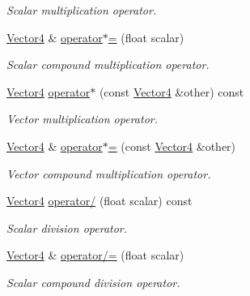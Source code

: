 \begin{DoxyCompactItemize}
\begin{DoxyCompactList}\small\item\em Scalar multiplication operator. \end{DoxyCompactList}\item 
\hyperlink{classchaos_1_1gfx_1_1_vector4}{Vector4} \& \hyperlink{classchaos_1_1gfx_1_1_vector4_ae171d478578a7a1564ca3e869da3b3f8}{operator$\ast$=} (float scalar)
\begin{DoxyCompactList}\small\item\em Scalar compound multiplication operator. \end{DoxyCompactList}\item 
\hyperlink{classchaos_1_1gfx_1_1_vector4}{Vector4} \hyperlink{classchaos_1_1gfx_1_1_vector4_a4f669aee39927f0953a445342754bf81}{operator$\ast$} (const \hyperlink{classchaos_1_1gfx_1_1_vector4}{Vector4} \&other) const 
\begin{DoxyCompactList}\small\item\em Vector multiplication operator. \end{DoxyCompactList}\item 
\hyperlink{classchaos_1_1gfx_1_1_vector4}{Vector4} \& \hyperlink{classchaos_1_1gfx_1_1_vector4_a5e9b011fc9fed1e3d9c8aaaf0ace80de}{operator$\ast$=} (const \hyperlink{classchaos_1_1gfx_1_1_vector4}{Vector4} \&other)
\begin{DoxyCompactList}\small\item\em Vector compound multiplication operator. \end{DoxyCompactList}\item 
\hyperlink{classchaos_1_1gfx_1_1_vector4}{Vector4} \hyperlink{classchaos_1_1gfx_1_1_vector4_accffe88c758a09b13b68ee1692663de9}{operator/} (float scalar) const 
\begin{DoxyCompactList}\small\item\em Scalar division operator. \end{DoxyCompactList}\item 
\hyperlink{classchaos_1_1gfx_1_1_vector4}{Vector4} \& \hyperlink{classchaos_1_1gfx_1_1_vector4_a1ce1c817fbc1999faeb34d08f4df284b}{operator/=} (float scalar)
\begin{DoxyCompactList}\small\item\em Scalar compound division operator. \end{DoxyCompactList}\end{DoxyCompactItemize}
